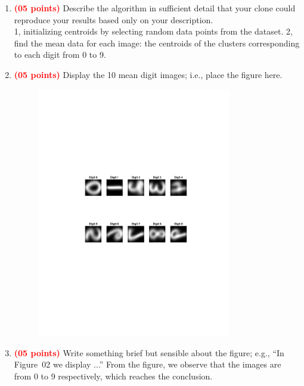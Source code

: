 \documentclass[dvipsnames,12pt]{article} %
\newcommand{\Brd}[1]{{\textbf{\textcolor{Red}{#1}}}}               %
\begin{document}
        \begin{enumerate}

          \item \Brd{(05 points)} Describe the algorithm in sufficient detail that your clone could
            reproduce your results based only on your description.\\
            1, initializing centroids by selecting random data points from the dataset.
            2, find the mean data for each image: the centroids of the clusters corresponding to each digit from 0 to 9.
          \item \Brd{(05 points)} Display the 10 mean digit images; i.e., place the figure here.
        \begin{figure}[H]
          \centering
          \includegraphics[width=0.8\textwidth]{mean_digits.pdf}
          \label{fig:music}
        \end{figure}
          \vspace{06pt}

          \item \Brd{(05 points)} Write something brief but sensible about the figure; e.g., ``In
          Figure~02 we display ...''
        From the figure, we observe that the images are from 0 to 9 respectively, which reaches the conclusion. 
        \end{enumerate}
\end{document}
